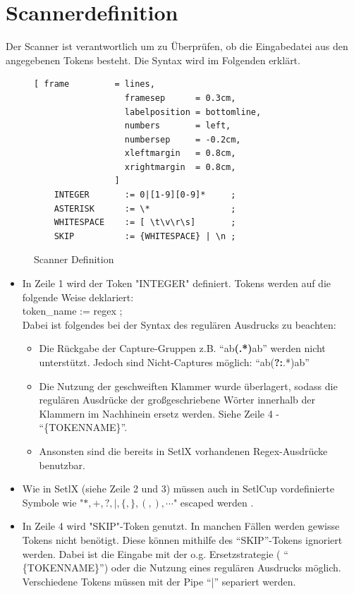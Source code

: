 \section{Scannerdefinition}
Der Scanner ist verantwortlich um zu Überprüfen, ob die Eingabedatei aus den angegebenen Tokens besteht. Die Syntax wird im Folgenden erklärt.
\begin{figure}[!ht]
\begin{Verbatim}[ frame         = lines, 
                  framesep      = 0.3cm, 
                  labelposition = bottomline,
                  numbers       = left,
                  numbersep     = -0.2cm,
                  xleftmargin   = 0.8cm,
                  xrightmargin  = 0.8cm,
                ]
	INTEGER       := 0|[1-9][0-9]*     ;
	ASTERISK      := \*                ;
	WHITESPACE    := [ \t\v\r\s]       ;
	SKIP          := {WHITESPACE} | \n ;
\end{Verbatim}
\caption{Scanner Definition}
\label{fig:scanner_def}
\end{figure}
\begin{itemize}
	\item In Zeile 1 wird der Token "INTEGER" definiert. Tokens werden auf die folgende Weise deklariert:\\
					token\_name := regex ; \\
					Dabei ist folgendes bei der Syntax des regulären Ausdrucks zu beachten:
					\begin{itemize}
						\item Die Rückgabe der Capture-Gruppen z.B. "`ab\textbf{(.*)}ab"'	werden nicht unterstützt. Jedoch sind Nicht-Captures möglich: "`ab(\textbf{?:}.*)ab"'
						\item Die Nutzung der geschweiften Klammer wurde überlagert, sodass die regulären Ausdrücke der großgeschriebene Wörter innerhalb der Klammern im Nachhinein ersetz werden. Siehe Zeile 4 - "`\{TOKENNAME\}"'.
						\item Ansonsten sind die bereits in SetlX vorhandenen Regex-Ausdrücke benutzbar.
					\end{itemize}
	\item Wie in SetlX (siehe Zeile 2 und 3) müssen auch in SetlCup vordefinierte Symbole wie "$*,+,?,|,\{,\},(,),\cdots$" escaped werden .
	\item In Zeile 4 wird "SKIP"-Token genutzt. In manchen Fällen werden gewisse Tokens nicht benötigt. Diese können mithilfe des "`SKIP"'-Tokens ignoriert werden. Dabei ist die Eingabe mit der o.g. Ersetzstrategie ( "` \{TOKENNAME\}"') oder die Nutzung eines regulären Ausdrucks möglich. Verschiedene Tokens müssen mit der Pipe "`|"' separiert werden.
\end{itemize}

